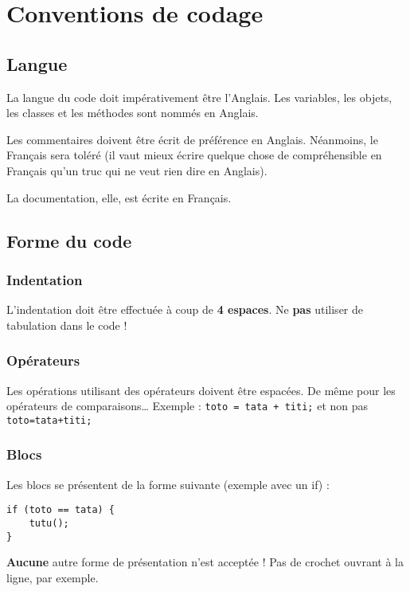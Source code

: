 \section{Conventions de codage}\label{annexe-conventions}

\subsection{Langue}

La langue du code doit impérativement être l'Anglais. Les variables, les objets, les classes et les méthodes sont nommés en Anglais.

Les commentaires doivent être écrit de préférence en Anglais. Néanmoins, le Français sera toléré (il vaut mieux écrire quelque chose de compréhensible en Français qu'un truc qui ne veut rien dire en Anglais).

La documentation, elle, est écrite en Français.

\subsection{Forme du code}

\subsubsection{Indentation}

L'indentation doit être effectuée à coup de \textbf{4 espaces}. Ne \textbf{pas} utiliser de tabulation dans le code !

\subsubsection{Opérateurs}

Les opérations utilisant des opérateurs doivent être espacées. De même pour les opérateurs de comparaisons…
Exemple : \verb!toto = tata + titi;! et non pas \verb!toto=tata+titi;! 

\subsubsection{Blocs}

Les blocs se présentent de la forme suivante (exemple avec un if) :
\begin{verbatim}
if (toto == tata) {
    tutu();
}
\end{verbatim}

\textbf{Aucune} autre forme de présentation n'est acceptée ! Pas de crochet ouvrant à la ligne, par exemple.

